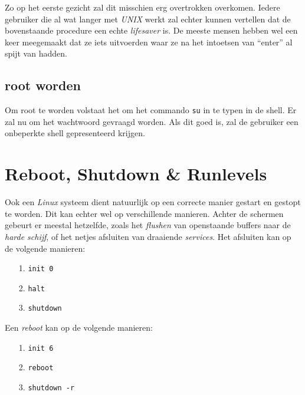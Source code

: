 Zo op het eerste gezicht zal dit misschien erg overtrokken overkomen. Iedere gebruiker die al wat langer met \emph{UNIX} werkt zal echter kunnen vertellen dat de bovenstaande procedure een echte \emph{lifesaver} is. De meeste mensen hebben wel een keer meegemaakt dat ze iets uitvoerden waar ze na het intoetsen van ``enter'' al spijt van hadden.

\subsection{root worden}
Om root te worden volstaat het om het commando \texttt{su} in te typen in de shell. Er zal nu om het wachtwoord gevraagd worden. Als dit goed is, zal de gebruiker een onbeperkte shell gepresenteerd krijgen. 

\section{Reboot, Shutdown \& Runlevels}
Ook een \emph{Linux} systeem dient natuurlijk op een correcte manier gestart en gestopt te worden. Dit kan echter wel op verschillende manieren. Achter de schermen gebeurt er meestal hetzelfde, zoals het \emph{flushen} van openstaande buffers naar de \emph{harde schijf}, of het netjes afsluiten van draaiende \emph{services}. Het afsluiten kan op de volgende manieren: 
\begin{itemize}
  \item[1.] \texttt{init 0}
  \item[2.] \texttt{halt}
  \item[3.] \texttt{shutdown}
\end{itemize}

Een \emph{reboot} kan op de volgende manieren:
\begin{itemize}
  \item[1.] \texttt{init 6}
  \item[2.] \texttt{reboot}
  \item[3.] \texttt{shutdown -r}
\end{itemize}

